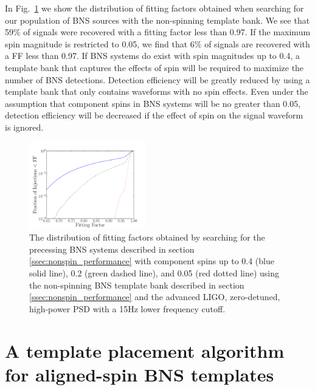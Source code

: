 
In Fig.~\ref{fig:no_spin_cover} we show the distribution of fitting factors
obtained when searching for our population of BNS sources with the
non-spinning template bank. We see that 59\% of signals were recovered with a
fitting factor less than 0.97.  If the maximum spin magnitude is restricted to
0.05, we find that 6\% of signals are recovered with a FF less
than 0.97.  If BNS systems do exist with spin magnitudes up to 0.4, a template
bank that captures the effects of spin will be required to maximize the number
of BNS detections.  Detection efficiency will be greatly reduced by using a
template bank that only contains waveforms with no spin effects.  Even under
the assumption that component spins in BNS systems will be no greater
than 0.05, detection efficiency will be decreased if the effect of spin on the
signal waveform is ignored.

\begin{figure}
\begin{center}
\includegraphics[width=0.45\textwidth]{papers/bns_spin/figure1.pdf}
\end{center}
\caption{\label{fig:no_spin_cover} The distribution of fitting factors obtained by searching
for the precessing BNS systems described in section \ref{ssec:nonspin_performance}
with component spins up to 0.4 (blue solid line), 0.2 (green dashed line), and 0.05 (red dotted line) using the non-spinning
BNS template bank described in section \ref{ssec:nonspin_performance} and the advanced LIGO, zero-detuned,
high-power PSD with a 15Hz lower frequency cutoff.}
\end{figure}

\section{A template placement algorithm for aligned-spin BNS templates}
\label{sec:param_space}

